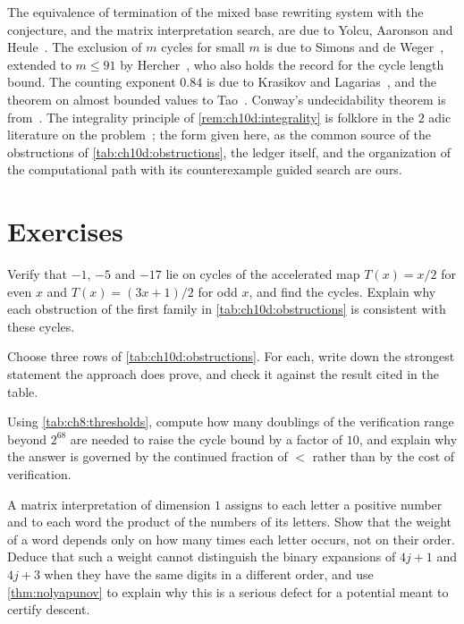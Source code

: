 The equivalence of termination of the mixed base rewriting system with the
conjecture, and the matrix interpretation search, are due to Yolcu, Aaronson and
Heule~\cite{yolcu2023}. The exclusion of $m$ cycles for small $m$ is due to
Simons and de Weger~\cite{simons2005}, extended to $m\le91$ by
Hercher~\cite{hercher2023}, who also holds the record for the cycle length
bound. The counting exponent $0.84$ is due to Krasikov and
Lagarias~\cite{krasikov2003}, and the theorem on almost bounded values to
Tao~\cite{tao2022}. Conway's undecidability theorem is from~\cite{conway1972}.
The integrality principle of \cref{rem:ch10d:integrality} is folklore in the
$2$ adic literature on the problem~\cite{lagarias1985}; the form given here,
as the common source of the obstructions of \cref{tab:ch10d:obstructions},
the ledger itself, and the organization of the computational path with its
counterexample guided search are ours.

\section*{Exercises}

\begin{exercise}
Verify that $-1$, $-5$ and $-17$ lie on cycles of the accelerated map
$T(x)=x/2$ for even $x$ and $T(x)=(3x+1)/2$ for odd $x$, and find the cycles.
Explain why each obstruction of the first family in
\cref{tab:ch10d:obstructions} is consistent with these cycles.
\end{exercise}

\begin{exercise}
Choose three rows of \cref{tab:ch10d:obstructions}. For each, write down the
strongest statement the approach does prove, and check it against the result
cited in the table.
\end{exercise}

\begin{exercise}
Using \cref{tab:ch8:thresholds}, compute how many doublings of the verification
range beyond $2^{68}$ are needed to raise the cycle bound by a factor of $10$,
and explain why the answer is governed by the continued fraction of $\lt$ rather
than by the cost of verification.
\end{exercise}

\begin{exercise}
A matrix interpretation of dimension $1$ assigns to each letter a positive
number and to each word the product of the numbers of its letters. Show that
the weight of a word depends only on how many times each letter occurs, not on
their order. Deduce that such a weight cannot distinguish the binary
expansions of $4j+1$ and $4j+3$ when they have the same digits in a different
order, and use \cref{thm:nolyapunov} to explain why this is a serious defect
for a potential meant to certify descent.
\end{exercise}
